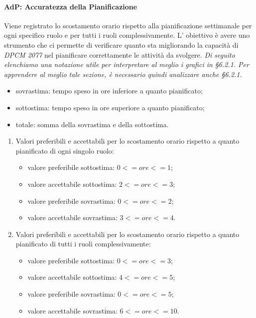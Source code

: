 		\paragraph{AdP: Accuratezza della Pianificazione}
		Viene registrato lo scostamento orario rispetto alla pianificazione settimanale per ogni specifico ruolo e per tutti i ruoli complessivamente.
		L' obiettivo è avere uno strumento che ci permette di verificare quanto sta migliorando la capacità di \textit{DPCM 2077} nel pianificare correttamente le attività da svolgere.
		\textit{Di seguito elenchiamo una notazione utile per interpretare al meglio i grafici in §6.2.1. Per apprendere al meglio tale sezione, è necessario quindi analizzare anche §6.2.1.}
		\begin{itemize}
		\item sovrastima: tempo speso in ore inferiore a quanto pianificato;
		\item sottostima: tempo speso in ore superiore a quanto pianificato;
		\item  totale: somma della sovrastima e della sottostima.
		\end{itemize}
		\begin{enumerate}
		\item Valori preferibili e accettabili per lo scostamento orario rispetto a quanto pianificato di ogni singolo ruolo:
		\begin{itemize}
		\item valore preferibile sottostima: $0 <= ore <= 1$;
		\item valore accettabile sottostima: $2 <= ore <= 3$;
		\item valore preferibile sovrastima: $0 <= ore <= 2$;
		\item valore accettabile sovrastima: $3 <= ore <= 4$.
		\end{itemize}
		\item Valori preferibili e accettabili per lo scostamento orario rispetto a quanto pianificato di tutti i ruoli complessivamente:
		\begin{itemize}
		\item valore preferibile sottostima: $ 0 <= ore <= 3 $;
		\item valore accettabile sottostima: $ 4 <= ore <= 5 $;
		\item valore preferibile sovrastima: $0 <= ore <= 5$;
		\item valore accettabile sovrastima: $ 6 <= ore <= 10 $.
		\end{itemize}
		\end{enumerate}
		
